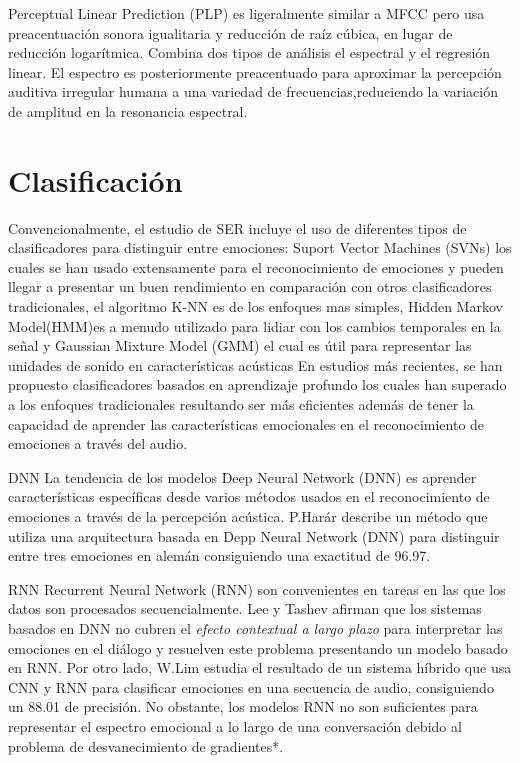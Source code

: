 \documentclass[11pt,a4paper,spanish]{book}
\begin{document}
	Perceptual Linear Prediction (PLP) es ligeralmente similar a MFCC pero usa preacentuación sonora igualitaria y reducción de raíz cúbica, en lugar de reducción logarítmica. Combina dos tipos de análisis el espectral y el regresión linear. El espectro es posteriormente preacentuado para aproximar la percepción auditiva irregular humana a una variedad de frecuencias,reduciendo la variación de amplitud en la resonancia espectral.
	
	\section{Clasificación}
	Convencionalmente, el estudio de SER incluye el uso de diferentes tipos de clasificadores para distinguir entre emociones: Suport Vector Machines (SVNs) los cuales se han usado extensamente para el reconocimiento de emociones y pueden llegar a presentar un buen rendimiento en comparación con otros clasificadores tradicionales, el algoritmo K-NN es de los enfoques mas simples, Hidden Markov Model(HMM)es a menudo utilizado para lidiar con los cambios temporales en la señal y Gaussian Mixture Model (GMM) el cual es útil para representar las unidades de sonido en características acústicas %
	En estudios más recientes, se han propuesto clasificadores basados en aprendizaje profundo los cuales han superado a los enfoques tradicionales resultando ser más eficientes además de tener la capacidad de aprender las características emocionales en el reconocimiento de emociones a través del audio.
	
	DNN
	La tendencia de los modelos Deep Neural Network (DNN) es aprender características específicas desde varios métodos usados en el reconocimiento de emociones a través de la percepción acústica.
	P.Harár \cite{Harar2017} describe un método que utiliza una arquitectura basada en Depp Neural Network (DNN) para distinguir entre tres emociones en alemán consiguiendo una exactitud de 96.97.
	
	RNN 
	Recurrent Neural Network (RNN) son convenientes en tareas en las que los datos son procesados secuencialmente.
	Lee y Tashev \cite{Lee2015} afirman que los sistemas basados en DNN no cubren el \emph{efecto contextual a largo plazo} para interpretar las emociones en el diálogo y resuelven este problema presentando un modelo basado en RNN. Por otro lado, W.Lim \cite{Lim2017} estudia el resultado de un sistema híbrido que usa CNN y RNN para clasificar emociones en una secuencia de audio, consiguiendo un 88.01 de precisión.
	No obstante, los modelos RNN no son suficientes para representar el espectro emocional a lo largo de una conversación debido al problema de desvanecimiento de gradientes*.
	
\end{document}

